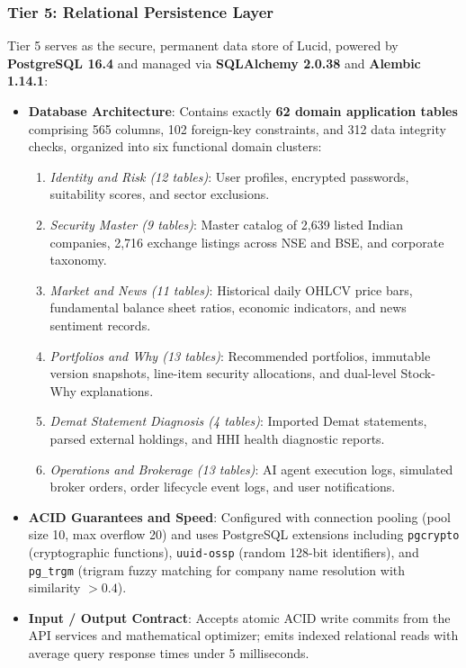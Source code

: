 \subsubsection{Tier 5: Relational Persistence Layer}
Tier 5 serves as the secure, permanent data store of Lucid, powered by \textbf{PostgreSQL 16.4} and managed via \textbf{SQLAlchemy 2.0.38} and \textbf{Alembic 1.14.1}:
\begin{itemize}
    \item \textbf{Database Architecture}: Contains exactly \textbf{62 domain application tables} comprising 565 columns, 102 foreign-key constraints, and 312 data integrity checks, organized into six functional domain clusters:
    \begin{enumerate}
        \item \textit{Identity and Risk (12 tables)}: User profiles, encrypted passwords, suitability scores, and sector exclusions.
        \item \textit{Security Master (9 tables)}: Master catalog of 2,639 listed Indian companies, 2,716 exchange listings across NSE and BSE, and corporate taxonomy.
        \item \textit{Market and News (11 tables)}: Historical daily OHLCV price bars, fundamental balance sheet ratios, economic indicators, and news sentiment records.
        \item \textit{Portfolios and Why (13 tables)}: Recommended portfolios, immutable version snapshots, line-item security allocations, and dual-level Stock-Why explanations.
        \item \textit{Demat Statement Diagnosis (4 tables)}: Imported Demat statements, parsed external holdings, and HHI health diagnostic reports.
        \item \textit{Operations and Brokerage (13 tables)}: AI agent execution logs, simulated broker orders, order lifecycle event logs, and user notifications.
    \end{enumerate}
    \item \textbf{ACID Guarantees and Speed}: Configured with connection pooling (pool size 10, max overflow 20) and uses PostgreSQL extensions including \texttt{pgcrypto} (cryptographic functions), \texttt{uuid-ossp} (random 128-bit identifiers), and \texttt{pg\_trgm} (trigram fuzzy matching for company name resolution with similarity $> 0.4$).
    \item \textbf{Input / Output Contract}: Accepts atomic ACID write commits from the API services and mathematical optimizer; emits indexed relational reads with average query response times under 5 milliseconds.
\end{itemize}

